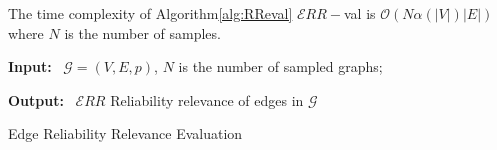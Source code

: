 \begin{theorem}
	The time complexity of Algorithm\ref{alg:RReval} $\mathcal{E}RR-$val is $\mathcal{O}(N \alpha(|V|) |E|)$ where $N$ is the number of samples.
\end{theorem}



\begin{algorithm}[!tb]
{\scriptsize
    \begin{algorithmic}[1]
       \item[] {\textbf{Input:} ~$\mathcal{G}=(V,E,\mathit{p})$, $N$ is the number of sampled graphs;~}
       \item[] {\textbf{Output:} ~$\mathcal{E}RR$ Reliability relevance of edges in $\mathcal{G}$}
    \ENDFOR
         \caption{Edge Reliability Relevance Evaluation}
        \label{alg:RReval}
    \end{algorithmic}
    }
\end{algorithm}
